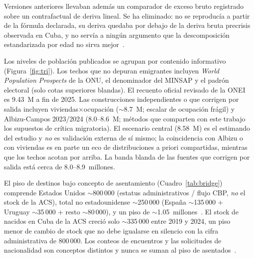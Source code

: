 \documentclass[11pt,a4paper]{article}
\begin{document}
Versiones anteriores llevaban además un comparador de exceso bruto registrado sobre un contrafactual de deriva lineal. Se ha eliminado: no se reproducía a partir de la fórmula declarada, su deriva quedaba por debajo de la deriva bruta precrisis observada en Cuba, y no servía a ningún argumento que la descomposición estandarizada por edad no sirva mejor~\citep{karlinsky2021,msemburi2023,kishore2018}.

Los niveles de población publicados se agrupan por contenido informativo (Figura~\ref{fig:tri}).
Los techos que no depuran emigrantes incluyen \emph{World Population Prospects} de la ONU, el denominador del MINSAP y el padrón electoral (solo cotas superiores blandas).
El recuento oficial revisado de la ONEI es 9.43~M a fin de 2025.
Las construcciones independientes o que corrigen por salida incluyen viviendas$\times$ocupación ($\sim$8.7~M; escalar de ocupación frágil) y Albizu-Campos 2023/2024 (8.0--8.6~M; métodos que comparten con este trabajo los supuestos de crítica migratoria).
El escenario central (8.58~M) es el estimando del estudio y \emph{no} es validación externa de sí mismo; la coincidencia con Albizu o con viviendas es en parte un eco de distribuciones a priori compartidas, mientras que los techos acotan por arriba.
La banda blanda de las fuentes que corrigen por salida está cerca de 8.0--8.9~millones.

El piso de destinos bajo concepto de asentamiento (Cuadro~\ref{tab:bridge}) comprende Estados Unidos $\sim$800\,000 (estatus administrativos / flujo CBP, \emph{no} el stock de la ACS), total no estadounidense $\sim$250\,000 (España $\sim$135\,000 + Uruguay $\sim$35\,000 + resto $\sim$80\,000), y un piso de $\sim$1.05~millones~\citep{destinations,pew_cuban}.
El stock de nacidos en Cuba de la ACS creció solo $\sim$335\,000 entre 2019 y 2024, un piso menor de cambio de stock que no debe igualarse en silencio con la cifra administrativa de 800\,000.
Los conteos de encuentros y las solicitudes de nacionalidad son conceptos distintos y nunca se suman al piso de asentados~\citep{cbp_encounters}.
\end{document}
